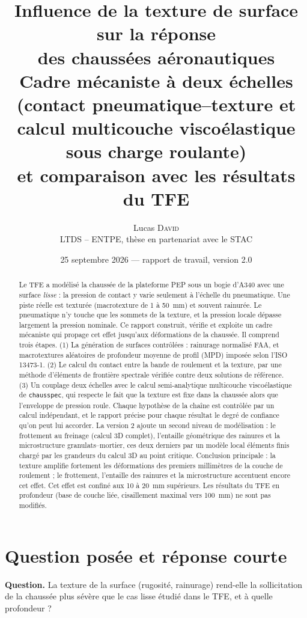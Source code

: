 \documentclass[11pt,a4paper]{article}
\title{\textbf{Influence de la texture de surface sur la réponse\\ des chaussées aéronautiques}\\[6pt]
\large Cadre mécaniste à deux échelles (contact pneumatique--texture et calcul multicouche
viscoélastique sous charge roulante)\\ et comparaison avec les résultats du TFE}
\author{Lucas \textsc{David}\\ \small LTDS -- ENTPE, thèse en partenariat avec le STAC}
\date{25 septembre 2026 --- rapport de travail, version 2.0}
\newcommand{\cs}{\texttt{chausspec}}
\begin{document}
\sloppy
\maketitle

\begin{abstract}
Le TFE a modélisé la chaussée de la plateforme PEP sous un bogie d'A340 avec une surface
\emph{lisse} : la pression de contact y varie seulement à l'échelle du pneumatique. Une piste
réelle est texturée (macrotexture de 1 à \SI{50}{mm}) et souvent rainurée. Le pneumatique n'y
touche que les sommets de la texture, et la pression locale dépasse largement la pression
nominale. Ce rapport construit, vérifie et exploite un cadre mécaniste qui propage cet effet
jusqu'aux déformations de la chaussée. Il comprend trois étapes. (1) La génération de surfaces
contrôlées : rainurage normalisé FAA, et macrotextures aléatoires de profondeur moyenne de profil
(MPD) imposée selon l'ISO 13473-1. (2) Le calcul du contact entre la bande de roulement et la
texture, par une méthode d'éléments de frontière spectrale vérifiée contre deux solutions de
référence. (3) Un couplage deux échelles avec le calcul semi-analytique multicouche
viscoélastique de \cs, qui respecte le fait que la texture est fixe dans la chaussée alors que
l'enveloppe de pression roule. Chaque hypothèse de la chaîne est contrôlée par un calcul
indépendant, et le rapport précise pour chaque résultat le degré de confiance qu'on peut lui
accorder.
La version 2 ajoute un second niveau de modélisation : le frottement au freinage (calcul 3D
complet), l'entaille géométrique des rainures et la microstructure granulats--mortier, ces deux
derniers par un modèle local éléments finis chargé par les grandeurs du calcul 3D au point
critique.
Conclusion principale : la texture amplifie fortement les déformations des premiers millimètres
de la couche de roulement ; le frottement, l'entaille des rainures et la microstructure
accentuent encore cet effet. Cet effet est confiné aux 10 à \SI{20}{mm} supérieurs. Les résultats du
TFE en profondeur (base de couche liée, cisaillement maximal vers \SI{100}{mm}) ne sont pas
modifiés.
\end{abstract}

\tableofcontents
\newpage

\section{Question posée et réponse courte}
\textbf{Question.} La texture de la surface (rugosité, rainurage) rend-elle la sollicitation de
la chaussée plus sévère que le cas lisse étudié dans le TFE, et à quelle profondeur ?
\end{document}
